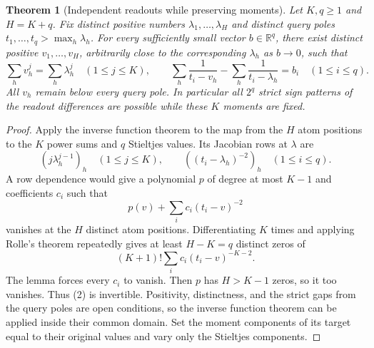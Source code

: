 \documentclass[11pt]{article}
\newtheorem{theorem}{Theorem}
\begin{document}
\begin{theorem}[Independent readouts while preserving moments]
Let $K,q\geq1$ and $H=K+q$. Fix distinct positive numbers
$\lambda_1,\ldots,\lambda_H$ and distinct query poles
$t_1,\ldots,t_q>\max_h\lambda_h$. For every sufficiently small
vector $b\in\mathbb R^q$, there exist distinct positive
$v_1,\ldots,v_H$, arbitrarily close to the corresponding
$\lambda_h$ as $b\to0$, such that
\[
 \sum_h v_h^j=\sum_h\lambda_h^j\quad(1\leq j\leq K),
 \qquad
 \sum_h\frac1{t_i-v_h}-\sum_h\frac1{t_i-\lambda_h}=b_i
 \quad(1\leq i\leq q).
 \tag{1}
\]
All $v_h$ remain below every query pole. In particular all $2^q$
strict sign patterns of the readout differences are possible while
these $K$ moments are fixed.
\end{theorem}
\begin{proof}
Apply the inverse function theorem to the map from the $H$ atom
positions to the $K$ power sums and $q$ Stieltjes values. Its
Jacobian rows at $\lambda$ are
\[
 (j\lambda_h^{j-1})_h\quad(1\leq j\leq K),
 \qquad ((t_i-\lambda_h)^{-2})_h\quad(1\leq i\leq q).
 \tag{2}
\]
A row dependence would give a polynomial $p$ of degree at most
$K-1$ and coefficients $c_i$ such that
\[
       p(v)+\sum_i c_i(t_i-v)^{-2}
 \tag{3}
\]
vanishes at the $H$ distinct atom positions. Differentiating $K$
times and applying Rolle's theorem repeatedly gives at least
$H-K=q$ distinct zeros of
\[
               (K+1)!\sum_i c_i(t_i-v)^{-K-2}.
\]
The lemma forces every $c_i$ to vanish. Then $p$ has $H>K-1$
zeros, so it too vanishes. Thus (2) is invertible. Positivity,
distinctness, and the strict gaps from the query poles are open
conditions, so the inverse function theorem can be applied inside
their common domain. Set the moment components of its target equal
to their original values and vary only the Stieltjes components.
\end{proof}
\end{document}
